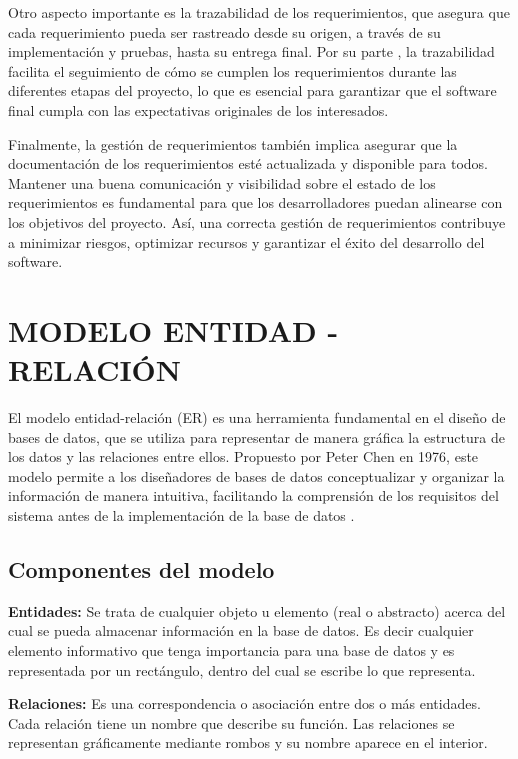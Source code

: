 		Otro aspecto importante es la trazabilidad de los requerimientos, que asegura que cada requerimiento pueda ser rastreado desde su origen, a través de su implementación y pruebas, hasta su entrega final. Por su parte \textcite{sommerville2011introduccion}, la trazabilidad facilita el seguimiento de cómo se cumplen los requerimientos durante las diferentes etapas del proyecto, lo que es esencial para garantizar que el software final cumpla con las expectativas originales de los interesados.
		
		Finalmente, la gestión de requerimientos también implica asegurar que la documentación de los requerimientos esté actualizada y disponible para todos. Mantener una buena comunicación y visibilidad sobre el estado de los requerimientos es fundamental para que los desarrolladores puedan alinearse con los objetivos del proyecto. Así, una correcta gestión de requerimientos contribuye a minimizar riesgos, optimizar recursos y garantizar el éxito del desarrollo del software.
				
	\section{MODELO ENTIDAD - RELACIÓN}
		El modelo entidad-relación (ER) es una herramienta fundamental en el diseño de bases de datos, que se utiliza para representar de manera gráfica la estructura de los datos y las relaciones entre ellos. Propuesto por Peter Chen en 1976, este modelo permite a los diseñadores de bases de datos conceptualizar y organizar la información de manera intuitiva, facilitando la comprensión de los requisitos del sistema antes de la implementación de la base de datos \parencite{theentity1976Chen}.
		
	\subsection{Componentes del modelo}
		
		\textbf{Entidades:} Se trata de cualquier objeto u elemento (real o abstracto) acerca del cual se pueda almacenar información en la base de datos. Es decir cualquier elemento informativo que tenga importancia para una base de datos y es representada por un rectángulo, dentro del cual se escribe lo que representa.
		
		\textbf{Relaciones:} Es una correspondencia o asociación entre dos o más entidades. Cada relación tiene un nombre que describe su función. Las relaciones se representan gráficamente mediante rombos y su nombre aparece en el interior.
		
